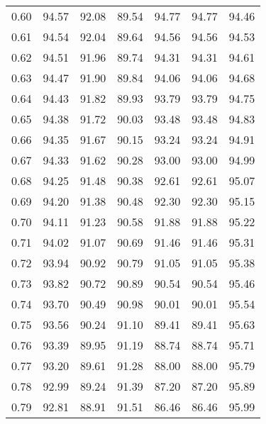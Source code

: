 \begin{tabular}{|c|c|c|c|c|c|c|}
      0.60 &     94.57 &     92.08 &      89.54 &   94.77 &      94.77 &         94.46 \\
      0.61 &     94.54 &     92.04 &      89.64 &   94.56 &      94.56 &         94.53 \\
      0.62 &     94.51 &     91.96 &      89.74 &   94.31 &      94.31 &         94.61 \\
      0.63 &     94.47 &     91.90 &      89.84 &   94.06 &      94.06 &         94.68 \\
      0.64 &     94.43 &     91.82 &      89.93 &   93.79 &      93.79 &         94.75 \\
      0.65 &     94.38 &     91.72 &      90.03 &   93.48 &      93.48 &         94.83 \\
      0.66 &     94.35 &     91.67 &      90.15 &   93.24 &      93.24 &         94.91 \\
      0.67 &     94.33 &     91.62 &      90.28 &   93.00 &      93.00 &         94.99 \\
      0.68 &     94.25 &     91.48 &      90.38 &   92.61 &      92.61 &         95.07 \\
      0.69 &     94.20 &     91.38 &      90.48 &   92.30 &      92.30 &         95.15 \\
      0.70 &     94.11 &     91.23 &      90.58 &   91.88 &      91.88 &         95.22 \\
      0.71 &     94.02 &     91.07 &      90.69 &   91.46 &      91.46 &         95.31 \\
      0.72 &     93.94 &     90.92 &      90.79 &   91.05 &      91.05 &         95.38 \\
      0.73 &     93.82 &     90.72 &      90.89 &   90.54 &      90.54 &         95.46 \\
      0.74 &     93.70 &     90.49 &      90.98 &   90.01 &      90.01 &         95.54 \\
      0.75 &     93.56 &     90.24 &      91.10 &   89.41 &      89.41 &         95.63 \\
      0.76 &     93.39 &     89.95 &      91.19 &   88.74 &      88.74 &         95.71 \\
      0.77 &     93.20 &     89.61 &      91.28 &   88.00 &      88.00 &         95.79 \\
      0.78 &     92.99 &     89.24 &      91.39 &   87.20 &      87.20 &         95.89 \\
      0.79 &     92.81 &     88.91 &      91.51 &   86.46 &      86.46 &         95.99 \\

\end{tabular}
